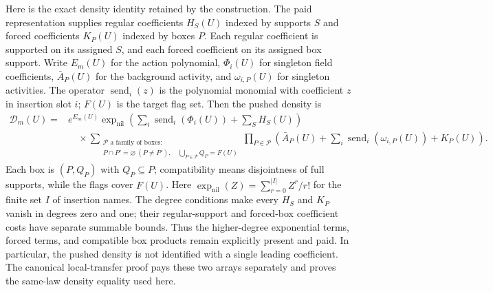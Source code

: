 Here is the exact density identity retained by the construction. The
paid representation supplies regular coefficients $H_S(U)$ indexed by
supports $S$ and forced coefficients $K_P(U)$ indexed by boxes $P$. Each
regular coefficient is supported on its assigned $S$, and each forced
coefficient on its assigned box support. Write $E_m(U)$ for the action
polynomial, $\Phi_i(U)$ for singleton field coefficients, $\bar A_P(U)$
for the background activity, and $\omega_{i,P}(U)$ for singleton
activities. The operator $\operatorname{send}_i(z)$ is the polynomial
monomial with coefficient $z$ in insertion slot $i$; $F(U)$ is the target
flag set. Then the pushed density is
\begin{align}\label{eq:ex-lattice-shell-served-density}
 \mathscr D_m(U)={}&e^{E_m(U)}\exp_{\mathrm{nil}}\!\left(
       \sum_i\operatorname{send}_i(\Phi_i(U))+\sum_S H_S(U)\right)\\
 &\quad\times
 \sum_{\substack{\mathcal P\text{ a family of boxes}:\\
        P\cap P'=\varnothing\ (P\ne P'),\quad
        \bigcup_{P\in\mathcal P}Q_P=F(U)}}
       \prod_{P\in\mathcal P}
       \left(\bar A_P(U)+\sum_i\operatorname{send}_i(\omega_{i,P}(U))
                    +K_P(U)\right).
\end{align}
Each box is $(P,Q_P)$ with $Q_P\subseteq P$; compatibility means
disjointness of full supports, while the flags cover $F(U)$. Here
$\exp_{\mathrm{nil}}(Z)=\sum_{r=0}^{|I|}Z^r/r!$ for the finite set $I$ of
insertion names. The degree conditions make every $H_S$ and $K_P$ vanish
in degrees zero and one; their regular-support and forced-box coefficient
costs have separate summable bounds.
Thus the higher-degree exponential terms, forced terms, and compatible
box products remain explicitly present and paid. In particular, the
pushed density is not identified with a single leading coefficient.
The canonical local-transfer proof pays these two arrays separately and
proves the same-law density equality used here.

